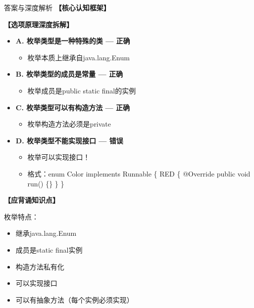 \documentclass[12pt, a4paper]{ctexart}
\begin{document}
\begin{enumerate}[label=\textbf{\arabic*.}]
\begin{bluebox}{答案与深度解析}
		      \textbf{【核心认知框架】}

		      \textbf{【选项原理深度拆解】}
					  \begin{itemize}[label={}, leftmargin=*, nosep]


		      \item \textbf{A. 枚举类型是一种特殊的类 — 正确}
					  \begin{itemize}[label={}, nosep]
		      
			      \item 枚举本质上继承自java.lang.Enum

					  \end{itemize}
		      \item \textbf{B. 枚举类型的成员是常量 — 正确}
					  \begin{itemize}[label={}, nosep]
		      
			      \item 枚举成员是public static final的实例
		      

					  \end{itemize}
		      \item \textbf{C. 枚举类型可以有构造方法 — 正确}
					  \begin{itemize}[label={}, nosep]
		      
			      \item 枚举构造方法必须是private
		      

					  \end{itemize}
		      \item \textbf{D. 枚举类型不能实现接口 — 错误}
					  \begin{itemize}[label={}, nosep]
		      
			      \item 枚举可以实现接口！
			      \item 格式：enum Color implements Runnable \{ RED \{ @Override public void run() \{\} \} \}
		      

		      
					  \end{itemize}
					  \end{itemize}
\textbf{【应背诵知识点】}

		      枚举特点：
		      \begin{itemize}[label={}, nosep]
			      \item 继承java.lang.Enum
			      \item 成员是static final实例
			      \item 构造方法私有化
			      \item 可以实现接口
			      \item 可以有抽象方法（每个实例必须实现）
		      \end{itemize}
		      \end{bluebox}


\end{enumerate}
\end{document}
